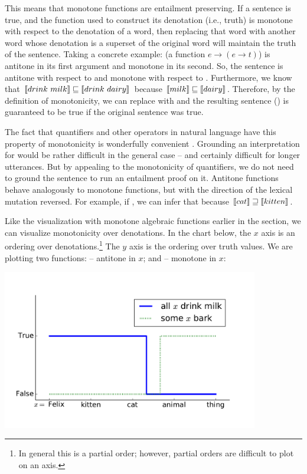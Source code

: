 This means that monotone functions are entailment preserving.
If a sentence is true, and the function used to construct its denotation (i.e., truth)
  is monotone with respect to the denotation of a word, then replacing that word with
  another word whose denotation is a superset of the original word will maintain
  the truth of the sentence.
Taking a concrete example:  (a function $e \rightarrow (e \rightarrow t)$)
  is antitone in its first argument and monotone in its second.
So, the sentence  is antitone with respect to  and
  monotone with respect to .
Furthermore, we know that 
  $\llbracket drink ~ milk\rrbracket \sqsubseteq \llbracket drink~dairy\rrbracket$
  because $\llbracket milk\rrbracket \sqsubseteq \llbracket dairy\rrbracket$.
Therefore, by the definition of monotonicity, we can replace  with
   and the resulting sentence ()
  is guaranteed to be true if the original sentence was true.

The fact that quantifiers and other operators in natural language have this
  property of monotonicity is wonderfully convenient \cite{key:1981barwise-quantifiers}.
Grounding an interpretation for  would be rather
  difficult in the general case -- and certainly difficult for longer utterances.
But by appealing to the monotonicity of quantifiers, we do not need to ground
  the sentence to run an entailment proof on it.
Antitone functions behave analogously to monotone functions, but with the 
  direction of the lexical mutation reversed.
For example, if , we can infer that 
   because 
  $\llbracket cat \rrbracket \sqsupseteq \llbracket kitten\rrbracket$.

Like the visualization with monotone algebraic functions earlier in the section,
  we can visualize monotonicity over denotations.
In the chart below, the $x$ axis is an ordering over denotations.\footnote{
    In general this is a partial order; however, partial orders are difficult
    to plot on an axis.
    }
The $y$ axis is the ordering over truth values.
We are plotting two functions:  -- antitone in $x$; and
   -- monotone in $x$:

\begin{center}
\includegraphics[height=7cm]{img/monotonicity_lex_all.pdf}
\end{center}

